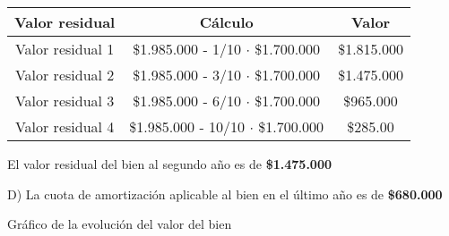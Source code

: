 \documentclass[12pt,a4paper]{article}
\begin{document}
        \begin{table}[H]
        \centering
        	\begin{tabular}{ | c | c | c | }
            	\hline
                Valor residual		&	Cálculo									&	Valor			\\ \hline
                Valor residual 1	&	\$1.985.000 - 1/10 $\cdot$ \$1.700.000	&	\$1.815.000		\\ \hline
                Valor residual 2	&	\$1.985.000 - 3/10 $\cdot$ \$1.700.000	&	\$1.475.000		\\ \hline
                Valor residual 3	&	\$1.985.000 - 6/10 $\cdot$ \$1.700.000	&	\$965.000		\\ \hline
                Valor residual 4	&	\$1.985.000 - 10/10 $\cdot$ \$1.700.000	&	\$285.00		\\ \hline
			\end{tabular}
		\end{table}
        
        \par{
        	El valor residual del bien al segundo año es de \textbf{\$1.475.000}
            }
		
        \hrulefill
        
        D) La cuota de amortización aplicable al bien en el último año es de \textbf{\$680.000}
        
        \hrulefill
        
        \par{
        	Gráfico de la evolución del valor del bien
            }
		
\end{document}

